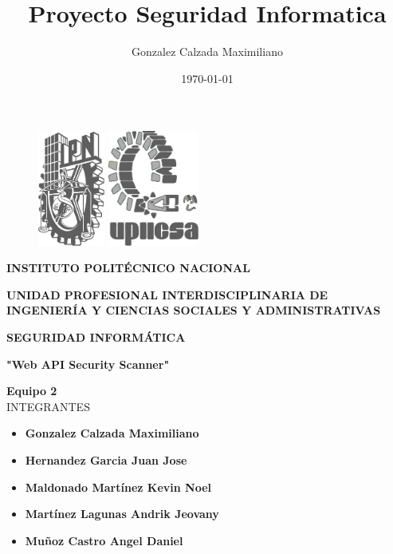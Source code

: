 \documentclass{article}
\title{Proyecto Seguridad Informatica}
\author{Gonzalez Calzada Maximiliano}
\date{\today}
\begin{document}
    \thispagestyle{empty}
        
    \begin{figure}[ht]
            \includegraphics[width=2.2cm]{IPN_Logo.pdf}
            \label{LogoIPN}
        \endminipage
        \hspace{0.60\textwidth}
            \includegraphics[width=3cm]{UPIICSA_Logo.pdf}
            \label{LogoUPIICSA}
        \endminipage
    \end{figure}
	
	\begin{center}
        \vspace{0.8cm}
        \LARGE
        \textbf{INSTITUTO POLITÉCNICO NACIONAL}
        
        \vspace{0.8cm}
        \LARGE
        \textbf{UNIDAD PROFESIONAL INTERDISCIPLINARIA DE INGENIERÍA Y CIENCIAS SOCIALES Y ADMINISTRATIVAS}
        
        \vspace{0.8cm}	
        \Large
        \textbf{SEGURIDAD INFORMÁTICA}

        \vspace{0.8cm}
        \LARGE
        \textbf{"Web API Security Scanner"}

    \end{center}

        \vspace{0.6cm}
        \large	
        \textbf{Equipo 2} \\
        \normalsize
        INTEGRANTES \\
        \vspace{0.2cm}
        \normalsize
        \begin{itemize}
            \item \textbf{Gonzalez Calzada Maximiliano}
            \item \textbf{Hernandez Garcia Juan Jose}
            \item \textbf{Maldonado Martínez Kevin Noel}
            \item \textbf{Martínez Lagunas Andrik Jeovany}
            \item \textbf{Muñoz Castro Angel Daniel}
        \end{itemize}
        
\end{document}
